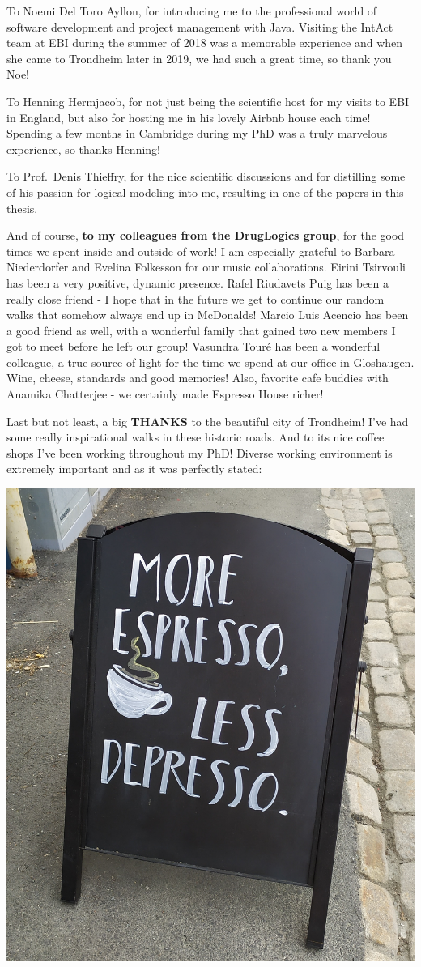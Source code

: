 \documentclass[
  12pt,
]{book}
\begin{document}
To Noemi Del Toro Ayllon, for introducing me to the professional world of software development and project management with Java. Visiting the IntAct team at EBI during the summer of 2018 was a memorable experience and when she came to Trondheim later in 2019, we had such a great time, so thank you Noe!

To Henning Hermjacob, for not just being the scientific host for my visits to EBI in England, but also for hosting me in his lovely Airbnb house each time! Spending a few months in Cambridge during my PhD was a truly marvelous experience, so thanks Henning!

To Prof.~Denis Thieffry, for the nice scientific discussions and for distilling some of his passion for logical modeling into me, resulting in one of the papers in this thesis.

And of course, \textbf{to my colleagues from the DrugLogics group}, for the good times we spent inside and outside of work! I am especially grateful to Barbara Niederdorfer and Evelina Folkesson for our music collaborations. Eirini Tsirvouli has been a very positive, dynamic presence. Rafel Riudavets Puig has been a really close friend - I hope that in the future we get to continue our random walks that somehow always end up in McDonalds! Marcio Luis Acencio has been a good friend as well, with a wonderful family that gained two new members I got to meet before he left our group! Vasundra Touré has been a wonderful colleague, a true source of light for the time we spend at our office in Gloshaugen. Wine, cheese, standards and good memories! Also, favorite cafe buddies with Anamika Chatterjee - we certainly made Espresso House richer!

Last but not least, a big \textbf{THANKS} to the beautiful city of Trondheim! I've had some really inspirational walks in these historic roads. And to its nice coffee shops I've been working throughout my PhD! Diverse working environment is extremely important and as it was perfectly stated:

\begin{center}\includegraphics[width=0.4\linewidth]{img/depresso} \end{center}
\end{document}
